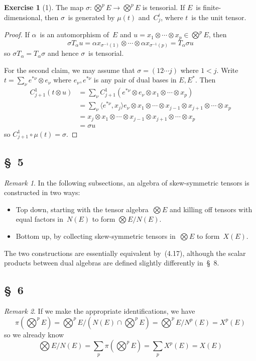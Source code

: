 \documentclass[letterpaper,12pt]{article}
\newcommand{\sect}{\cap}
\newcommand{\after}{\circ}
\newcommand{\tprod}{\otimes}
\newcommand{\bigtprod}{\bigotimes}
\newcommand{\medtprod}{{\textstyle\bigtprod}}
\newcommand{\sprod}[2]{\langle#1,#2\rangle}
\newcommand{\multi}[4]{#2_{#3}#1\cdots#1#2_{#4}}
\newcommand{\tprods}[3]{\multi{\tprod}{#1}{#2}{#3}}
\theoremstyle{definition}
\newtheorem*{exer}{Exercise}
\theoremstyle{remark}
\newtheorem*{rmk}{Remark}
\begin{document}
\begin{exer}[1]
The map \(\sigma:\medtprod^p E\to\medtprod^p E\) is tensorial. If \(E\)~is finite-dimensional, then \(\sigma\)~is generated by \(\mu(t)\) and~\(C^i_j\), where \(t\)~is the unit tensor.
\end{exer}
\begin{proof}
If \(\alpha\)~is an automorphism of~\(E\) and \(u=\tprods{x}{1}{p}\in\medtprod^p E\), then
\[\sigma T_{\alpha}u=\tprods{\alpha x}{\sigma^{-1}(1)}{\sigma^{-1}(p)}=T_{\alpha}\sigma u\]
so \(\sigma T_{\alpha}=T_{\alpha}\sigma\) and hence \(\sigma\)~is tensorial.

For the second claim, we may assume that \(\sigma=(12\cdots j)\) where \(1<j\). Write \(t=\sum_{\nu}e^{*\nu}\tprod e_{\nu}\) where \(e_{\nu},e^{*\nu}\) is any pair of dual bases in \(E,E^*\). Then
\begin{align*}
C^1_{j+1}(t\tprod u)&=\sum_{\nu}C^1_{j+1}(e^{*\nu}\tprod e_{\nu}\tprod\tprods{x}{1}{p})\\
	&=\sum_{\nu}\sprod{e^{*\nu}}{x_j}e_{\nu}\tprod\tprods{x}{1}{j-1}\tprod\tprods{x}{j+1}{p}\\
	&=x_j\tprod\tprods{x}{1}{j-1}\tprod\tprods{x}{j+1}{p}\\
	&=\sigma u
\end{align*}
so \(C^1_{j+1}\after\mu(t)=\sigma\).
\end{proof}

\subsection*{\S~5}
\begin{rmk}
In the following subsections, an algebra of skew-symmetric tensors is constructed in two ways:
\begin{itemize}
\item Top down, starting with the tensor algebra~\(\medtprod E\) and killing off tensors with equal factors in~\(N(E)\) to form \(\medtprod E/N(E)\).
\item Bottom up, by collecting skew-symmetric tensors in~\(\medtprod E\) to form~\(X(E)\).
\end{itemize}
The two constructions are essentially equivalent by~(4.17), although the scalar products between dual algebras are defined slightly differently in~\S~8.
\end{rmk}

\subsection*{\S~6}
\begin{rmk}
If we make the appropriate identifications, we have
\[\pi(\medtprod^p E)=\medtprod^p E/(N(E)\sect\medtprod^p E)=\medtprod^p E/N^p(E)=X^p(E)\]
so we already know
\[\medtprod E/N(E)=\sum_p \pi(\medtprod^p E)=\sum_p X^p(E)=X(E)\]
\end{rmk}
\end{document}
